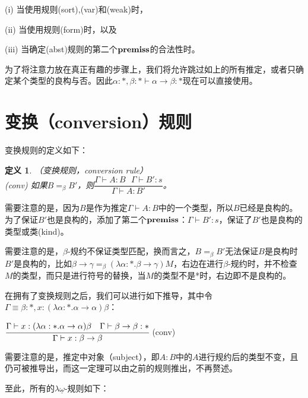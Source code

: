 \documentclass[UTF8]{article}
\newtheorem{thm}{定义}[section]
\begin{document}
		(i) 当使用规则(sort),(var)和(weak)时，
		
		(ii) 当使用规则(form)时，以及
		
		(iii) 当确定(abst)规则的第二个$\bf premiss$的合法性时。
		
		为了将注意力放在真正有趣的步骤上，我们将允许跳过如上的所有推定，或者只确定某个类型的良构与否。因此$\alpha:*,\beta:*\vdash\alpha\rightarrow\beta:*$现在可以直接使用。
		
	\section{变换（conversion）规则}
		\noindent
		变换规则的定义如下：
		
		\begin{thm}（变换规则，conversion rule）\\
			
			(conv) 如果$B=_\beta B'$，则$\dfrac{\Gamma\vdash A:B\ \ \ \Gamma\vdash B':s}{\Gamma\vdash A:B'}$。
		\end{thm}
	
		需要注意的是，因为$B$是作为推定$\Gamma\vdash A:B$中的一个类型，所以$B$已经是良构的。为了保证$B'$也是良构的，添加了第二个$\bf premiss$：$\Gamma\vdash B':s$，保证了$B'$也是良构的类型或类(kind)。
		
		需要注意的是，$\beta$-规约不保证类型匹配，换而言之，$B=_\beta B'$无法保证$B$是良构时$B'$是良构的，比如$\beta\rightarrow\gamma=_\beta(\lambda\alpha:*.\beta\rightarrow\gamma)M$，右边在进行$\beta$-规约时，并不检查$M$的类型，而只是进行符号的替换，当$M$的类型不是*时，右边即不是良构的。
		
		在拥有了变换规则之后，我们可以进行如下推导，其中令$\Gamma\equiv\beta:*,x:(\lambda\alpha:*.\alpha\rightarrow\alpha)\beta$：
		
		$\cfrac{\Gamma\vdash x:(\lambda\alpha:*.\alpha\rightarrow\alpha)\beta\ \ \ \Gamma\vdash\beta\rightarrow\beta:*}{\Gamma\vdash x:\beta\rightarrow\beta}$ (conv)
		
		需要注意的是，推定中对象（subject），即$A:B$中的$A$进行规约后的类型不变，且仍可被推导出，而这一定理可以由之前的规则推出，不再赘述。
		
		至此，所有的$\lambda{\underline{\omega}}$-规则如下：
		
	
\end{document}
